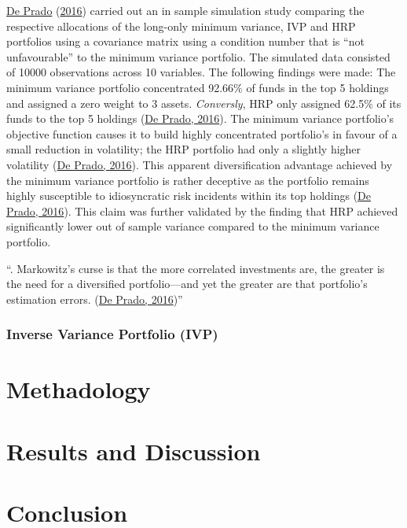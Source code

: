 \documentclass[11pt,preprint, authoryear]{elsarticle}
\numberwithin{equation}{section}
\numberwithin{figure}{section}
\numberwithin{table}{section}
\begin{document}
\protect\hyperlink{ref-lopez}{De Prado}
(\protect\hyperlink{ref-lopez}{2016}) carried out an in sample
simulation study comparing the respective allocations of the long-only
minimum variance, IVP and HRP portfolios using a covariance matrix using
a condition number that is ``not unfavourable'' to the minimum variance
portfolio. The simulated data consisted of 10000 observations across 10
variables. The following findings were made: The minimum variance
portfolio concentrated 92.66\% of funds in the top 5 holdings and
assigned a zero weight to 3 assets. \emph{Conversly}, HRP only assigned
62.5\% of its funds to the top 5 holdings
(\protect\hyperlink{ref-lopez}{De Prado, 2016}). The minimum variance
portfolio's objective function causes it to build highly concentrated
portfolio's in favour of a small reduction in volatility; the HRP
portfolio had only a slightly higher volatility
(\protect\hyperlink{ref-lopez}{De Prado, 2016}). This apparent
diversification advantage achieved by the minimum variance portfolio is
rather deceptive as the portfolio remains highly susceptible to
idiosyncratic risk incidents within its top holdings
(\protect\hyperlink{ref-lopez}{De Prado, 2016}). This claim was further
validated by the finding that HRP achieved significantly lower out of
sample variance compared to the minimum variance portfolio.

``. Markowitz's curse is that the more correlated investments are, the
greater is the need for a diversified portfolio---and yet the greater
are that portfolio's estimation errors.
(\protect\hyperlink{ref-lopez}{De Prado, 2016})''

\hypertarget{inverse-variance-portfolio-ivp}{%
\subsubsection{Inverse Variance Portfolio
(IVP)}\label{inverse-variance-portfolio-ivp}}

\hypertarget{methadology}{%
\section{Methadology}\label{methadology}}

\hypertarget{results-and-discussion}{%
\section{Results and Discussion}\label{results-and-discussion}}

\hypertarget{conclusion}{%
\section{Conclusion}\label{conclusion}}
\end{document}
